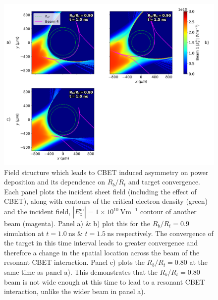 \begin{figure}[t!]
    \includegraphics[width=\linewidth]{Results1/Images/Field_profiles_alt.png}
    \centering
    \caption{Field structure which leads to \ac{CBET} induced asymmetry on power deposition and its dependence on $R_b/R_t$ and target convergence.
    Each panel plots the incident sheet field (including the effect of \ac{CBET}), along with contours of the critical electron density (green) and the incident field, $|E_z^{\text{in}}|=1\times10^{10}\ \text{Vm}^{-1}$ contour of another beam (magenta).
    Panel a) \& b) plot this for the $R_b/R_t=0.9$ simulation at $t=1.0\ \text{ns}$ \& $t=1.5\ \text{ns}$ respectively.
    The convergence of the target in this time interval leads to greater convergence and therefore a change in the spatial location across the beam of the resonant \ac{CBET} interaction.
    Panel c) plots the $R_b/R_t=0.80$ at the same time as panel a).
    This demonstrates that the $R_b/R_t=0.80$ beam is not wide enough at this time to lead to a resonant \ac{CBET} interaction, unlike the wider beam in panel a).}%
    \label{fig:Res1_field_profiles}
\end{figure}

